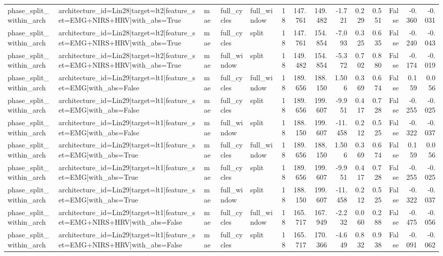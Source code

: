 \begin{table}
\begin{tabular}{lllllrrrrrrrrr}
phase_split_within_arch & architecture_id=Lin28|target=lt2|feature_set=EMG+NIRS+HRV|with_abs=True & mae & full_cycles & full_window & 18 & 147.761 & 149.482 & -1.721 & 0.229 & 0.551 & False & -0.360 & -0.031 \\
phase_split_within_arch & architecture_id=Lin28|target=lt2|feature_set=EMG+NIRS+HRV|with_abs=True & mae & full_cycles & split & 18 & 147.761 & 154.854 & -7.093 & 0.325 & 0.635 & False & -0.240 & -0.043 \\
phase_split_within_arch & architecture_id=Lin28|target=lt2|feature_set=EMG+NIRS+HRV|with_abs=True & mae & full_window & split & 18 & 149.482 & 154.854 & -5.372 & 0.702 & 0.880 & False & -0.174 & -0.019 \\
phase_split_within_arch & architecture_id=Lin29|target=lt1|feature_set=EMG|with_abs=False & mae & full_cycles & full_window & 18 & 189.656 & 188.150 & 1.506 & 0.369 & 0.674 & False & 0.159 & 0.056 \\
phase_split_within_arch & architecture_id=Lin29|target=lt1|feature_set=EMG|with_abs=False & mae & full_cycles & split & 18 & 189.656 & 199.607 & -9.951 & 0.417 & 0.728 & False & -0.255 & -0.025 \\
phase_split_within_arch & architecture_id=Lin29|target=lt1|feature_set=EMG|with_abs=False & mae & full_window & split & 18 & 188.150 & 199.607 & -11.458 & 0.212 & 0.525 & False & -0.322 & -0.037 \\
phase_split_within_arch & architecture_id=Lin29|target=lt1|feature_set=EMG|with_abs=True & mae & full_cycles & full_window & 18 & 189.656 & 188.150 & 1.506 & 0.369 & 0.674 & False & 0.159 & 0.056 \\
phase_split_within_arch & architecture_id=Lin29|target=lt1|feature_set=EMG|with_abs=True & mae & full_cycles & split & 18 & 189.656 & 199.607 & -9.951 & 0.417 & 0.728 & False & -0.255 & -0.025 \\
phase_split_within_arch & architecture_id=Lin29|target=lt1|feature_set=EMG|with_abs=True & mae & full_window & split & 18 & 188.150 & 199.607 & -11.458 & 0.212 & 0.525 & False & -0.322 & -0.037 \\
phase_split_within_arch & architecture_id=Lin29|target=lt1|feature_set=EMG+NIRS+HRV|with_abs=False & mae & full_cycles & full_window & 18 & 165.717 & 167.949 & -2.232 & 0.060 & 0.288 & False & -0.475 & -0.056 \\
phase_split_within_arch & architecture_id=Lin29|target=lt1|feature_set=EMG+NIRS+HRV|with_abs=False & mae & full_cycles & split & 18 & 165.717 & 170.366 & -4.649 & 0.832 & 0.938 & False & -0.091 & -0.062 \\

\end{tabular}
\end{table}
